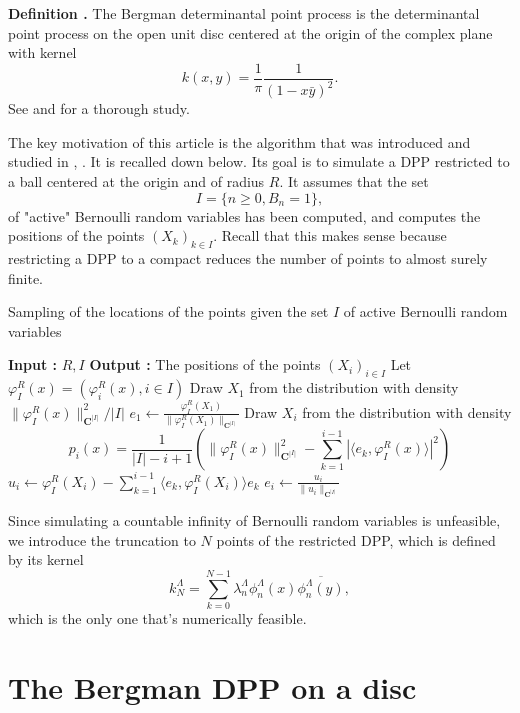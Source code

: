 \documentclass[11pt]{article}
\newcounter{cnt}
\newcommand{\cnt}{\thecnt \stepcounter{cnt}}
\begin{document}
\textbf{Definition \cnt.} The Bergman determinantal point process is the determinantal point process on the open unit disc centered at the origin of the complex plane with kernel
\[
k(x,y) = \frac{1}{\pi} \frac{1}{(1 - x\bar{y})^2}.
\]
See \cite{ZerosGaussianPowerSeries} and \cite{Hough2009ZerosGAF} for a thorough study.

The key motivation of this article is the algorithm that was introduced and studied in \cite{DecreusefondVergne2015}, \cite{DecreusefondMoroz2021}. It is recalled down below. Its goal is to simulate a DPP restricted to a ball centered at the origin and of radius $R$. It assumes that the set
\[
I = \{n \ge 0, B_n = 1\},
\]
of "active" Bernoulli random variables has been computed, and computes the positions of the points $(X_k)_{k \in I}$. Recall that this makes sense because restricting a DPP to a compact reduces the number of points to almost surely finite.

\begin{algorithm}
    \caption{Sampling of the locations of the points given the set $I$ of active Bernoulli random variables}
    \begin{algorithmic}[1]
    \State \textbf{Input :} $R, I$
    \State \textbf{Output :} The positions of the points $(X_i)_{i \in I}$
    \State Let $\varphi_I^R(x) = (\varphi_i^R(x), i \in I)$
    \State Draw $X_1$ from the distribution with density $\|\varphi_I^R(x)\|_{\mathbf{C}^{|I|}}^2 / |I|$
    \State $e_1 \leftarrow \frac{\varphi_I^R(X_1)}{\|\varphi_I^R(X_1)\|_{\mathbf{C}^{|I|}}}$
        \State Draw $X_i$ from the distribution with density
        \[ p_i(x) = \frac{1}{|I| - i + 1} \left( \|\varphi_I^R(x)\|_{\mathbf{C}^{|I|}}^2 - \sum_{k=1}^{i-1} |\langle e_k, \varphi_I^R(x) \rangle|^2 \right) \]
        \State $u_i \leftarrow \varphi_I^R(X_i) - \sum_{k=1}^{i-1} \langle e_k, \varphi_I^R(X_i) \rangle e_k$
        \State $e_i \leftarrow \frac{u_i}{\|u_i\|_{\mathbf{C}^{|I|}}}$
    \EndFor
    \end{algorithmic}
\end{algorithm}
  

Since simulating a countable infinity of Bernoulli random variables is unfeasible, we introduce
the truncation to $N$ points of the restricted DPP, which is defined by its kernel
\[
k_N^\Lambda = \sum_{k=0}^{N-1} \lambda_n^\Lambda \phi_n^\Lambda(x) \overline{\phi_n^\Lambda(y)},
\]
which is the only one that's numerically feasible.

\section{The Bergman DPP on a disc}
\end{document}
